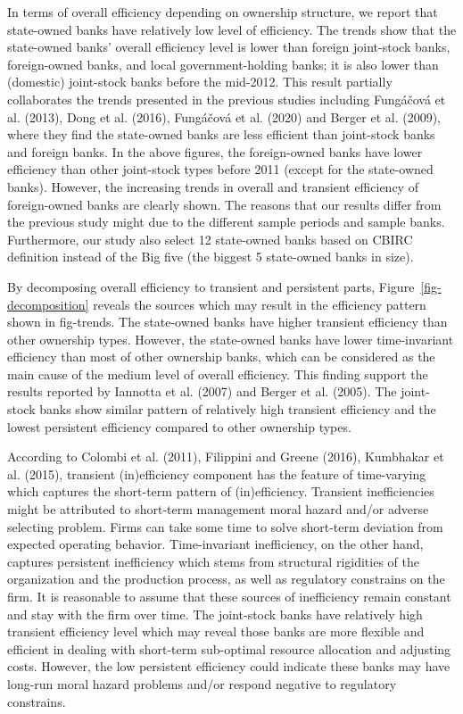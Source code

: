 \documentclass[
  12pt,
  a4paper,
]{scrreprt}
\begin{document}
{{{{In terms of overall efficiency depending on ownership structure, we
report that state-owned banks have relatively low level of efficiency.
The trends show that the state-owned banks' overall efficiency level is
lower than foreign joint-stock banks, foreign-owned banks, and local
government-holding banks; it is also lower than (domestic) joint-stock
banks before the mid-2012. This result partially collaborates the trends
presented in the previous studies including Fungáčová et al. (2013),
Dong et al. (2016), Fungáčová et al. (2020) and Berger et al. (2009),
where they find the state-owned banks are less efficient than
joint-stock banks and foreign banks. In the above figures, the
foreign-owned banks have lower efficiency than other joint-stock types
before 2011 (except for the state-owned banks). However, the increasing
trends in overall and transient efficiency of foreign-owned banks are
clearly shown. The reasons that our results differ from the previous
study might due to the different sample periods and sample banks.
Furthermore, our study also select 12 state-owned banks based on CBIRC
definition instead of the Big five (the biggest 5 state-owned banks in
size).

By decomposing overall efficiency to transient and persistent parts,
Figure~\ref{fig-decomposition} reveals the sources which may result in
the efficiency pattern shown in fig-trends. The state-owned banks have
higher transient efficiency than other ownership types. However, the
state-owned banks have lower time-invariant efficiency than most of
other ownership banks, which can be considered as the main cause of the
medium level of overall efficiency. This finding support the results
reported by Iannotta et al. (2007) and Berger et al. (2005). The
joint-stock banks show similar pattern of relatively high transient
efficiency and the lowest persistent efficiency compared to other
ownership types.

According to Colombi et al. (2011), Filippini and Greene (2016),
Kumbhakar et al. (2015), transient (in)efficiency component has the
feature of time-varying which captures the short-term pattern of
(in)efficiency. Transient inefficiencies might be attributed to
short-term management moral hazard and/or adverse selecting problem.
Firms can take some time to solve short-term deviation from expected
operating behavior. Time-invariant inefficiency, on the other hand,
captures persistent inefficiency which stems from structural rigidities
of the organization and the production process, as well as regulatory
constrains on the firm. It is reasonable to assume that these sources of
inefficiency remain constant and stay with the firm over time. The
joint-stock banks have relatively high transient efficiency level which
may reveal those banks are more flexible and efficient in dealing with
short-term sub-optimal resource allocation and adjusting costs. However,
the low persistent efficiency could indicate these banks may have
long-run moral hazard problems and/or respond negative to regulatory
constrains.

}}}}
\end{document}
